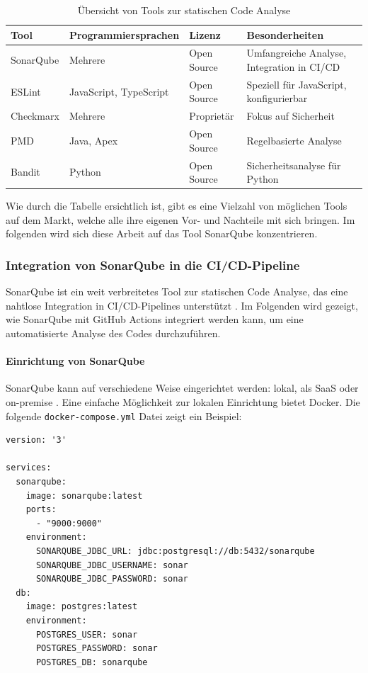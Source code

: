 \begin{table}[h!]
\centering
\begin{tabular}{|l|l|l|l|}
\hline
\textbf{Tool} & \textbf{Programmiersprachen} & \textbf{Lizenz} & \textbf{Besonderheiten} \\ \hline
SonarQube & Mehrere & Open Source & Umfangreiche Analyse, Integration in CI/CD \\ \hline
ESLint & JavaScript, TypeScript & Open Source & Speziell für JavaScript, konfigurierbar \\ \hline
Checkmarx & Mehrere & Proprietär & Fokus auf Sicherheit \\ \hline
PMD & Java, Apex & Open Source & Regelbasierte Analyse \\ \hline
Bandit & Python & Open Source & Sicherheitsanalyse für Python \\ \hline
\end{tabular}
\caption{Übersicht von Tools zur statischen Code Analyse}
\label{tab:static_code_analysis_tools}
\end{table}

Wie durch die Tabelle ersichtlich ist, gibt es eine Vielzahl von möglichen Tools auf dem Markt, welche alle ihre eigenen Vor- und Nachteile mit sich bringen. Im folgenden wird sich diese Arbeit auf das Tool SonarQube konzentrieren.

\subsubsection{Integration von SonarQube in die CI/CD-Pipeline}

SonarQube ist ein weit verbreitetes Tool zur statischen Code Analyse, das eine nahtlose Integration in CI/CD-Pipelines unterstützt \cite{SonarSource2023}. Im Folgenden wird gezeigt, wie SonarQube mit GitHub Actions integriert werden kann, um eine automatisierte Analyse des Codes durchzuführen.

\paragraph{Einrichtung von SonarQube}

SonarQube kann auf verschiedene Weise eingerichtet werden: lokal, als SaaS oder on-premise \cite{SonarSource2021a}. Eine einfache Möglichkeit zur lokalen Einrichtung bietet Docker. Die folgende \texttt{docker-compose.yml} Datei zeigt ein Beispiel:

\begin{lstlisting}
version: '3'

services:
  sonarqube:
    image: sonarqube:latest
    ports:
      - "9000:9000"
    environment:
      SONARQUBE_JDBC_URL: jdbc:postgresql://db:5432/sonarqube
      SONARQUBE_JDBC_USERNAME: sonar
      SONARQUBE_JDBC_PASSWORD: sonar
  db:
    image: postgres:latest
    environment:
      POSTGRES_USER: sonar
      POSTGRES_PASSWORD: sonar
      POSTGRES_DB: sonarqube
\end{lstlisting}

